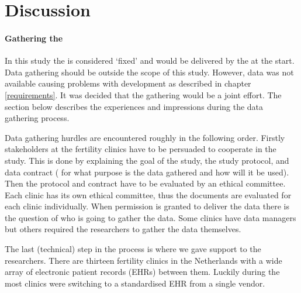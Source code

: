 \section{Discussion}

\paragraph{Gathering the \projectdata{}}

In this study the \projectdata{} is considered `fixed' and would be delivered by the \project{} at the start.
Data gathering should be outside the scope of this study.
However, data was not available causing problems with development as described in chapter \ref{requirements}.
It was decided that the gathering would be a joint effort.
The section below describes the experiences and impressions during the data gathering process.

Data gathering hurdles are encountered roughly in the following order.
Firstly stakeholders at the fertility clinics have to be persuaded to cooperate in the study.
This is done by explaining the goal of the study, the study protocol, and data contract (\ie{} for what purpose is the data gathered and how will it be used).
Then the protocol and contract have to be evaluated by an ethical committee.
Each clinic has its own ethical committee, thus the documents are evaluated for each clinic individually.
When permission is granted to deliver the data there is the question of who is going to gather the data.
Some clinics have data managers but others required the \project{} researchers to gather the data themselves.

The last (technical) step in the process is where we gave support to the \project{} researchers.
There are thirteen fertility clinics in the Netherlands with a wide array of electronic patient records (EHRs) between them.
Luckily during the \project{} most clinics were switching to a standardised EHR from a single vendor.

